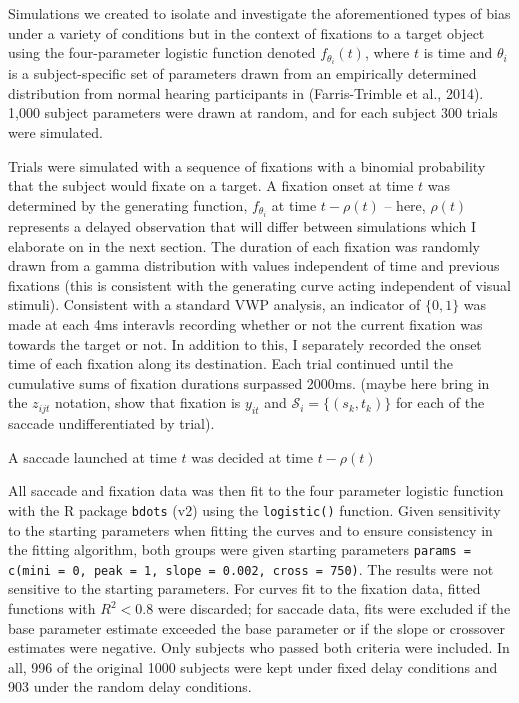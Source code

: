 \documentclass{article}
\newcommand{\xt}{\texttt}%
\begin{document}
Simulations we created to isolate and investigate the aforementioned types of bias under a variety of conditions but in the context of fixations to a target object using the four-parameter logistic function denoted $f_{\theta_i}(t)$, where $t$ is time and $\theta_i$ is a subject-specific set of parameters drawn from an empirically determined distribution from normal hearing participants in (Farris-Trimble et al., 2014). 1,000 subject parameters were drawn at random, and for each subject 300 trials were simulated.

Trials were simulated with a sequence of fixations with a binomial probability that the subject would fixate on a target. A fixation onset at time $t$ was determined by the generating function, $f_{\theta_i}$ at time $t - \rho(t)$ -- here, $\rho(t)$ represents a delayed observation that will differ between simulations which I elaborate on in the next section. The duration of each fixation was randomly drawn from a gamma distribution with values independent of time and previous fixations (this is consistent with the generating curve acting independent of visual stimuli). Consistent with a standard VWP analysis, an indicator of $\{0,1\}$ was made at each 4ms interavls recording whether or not the current fixation was towards the target or not. In addition to this, I separately recorded the onset time of each fixation along its destination. Each trial continued until the cumulative sums of fixation durations surpassed 2000ms. (maybe here bring in the $z_{ijt}$ notation, show that fixation is $y_{it}$ and $\mathcal{S}_i = \{(s_k, t_k)\}$ for each of the saccade undifferentiated by trial).

A saccade launched at time $t$ was decided at time $t-\rho(t)$
 

All saccade and fixation data was then fit to the four parameter logistic function with the R package \xt{bdots} (v2) using the \xt{logistic()} function. Given sensitivity to the starting parameters when fitting the curves and to ensure consistency in the fitting algorithm, both groups were given starting parameters \xt{params = c(mini = 0, peak = 1, slope = 0.002,  cross = 750)}. The results were not sensitive to the starting parameters. For curves fit to the fixation data, fitted functions with $R^2 < 0.8$ were discarded; for saccade data, fits were excluded if the base parameter estimate exceeded the base parameter or if the slope or crossover estimates were negative. Only subjects who passed both criteria were included. In all, 996 of the original 1000 subjects were kept under fixed delay conditions and 903 under the random delay conditions.
\end{document}
